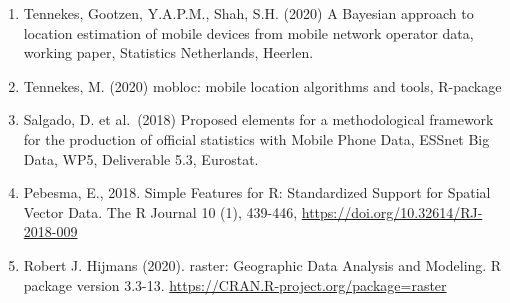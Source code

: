 \documentclass[
]{article}
\providecommand{\tightlist}{%
  \setlength{\itemsep}{0pt}\setlength{\parskip}{0pt}}
\begin{document}
\begin{enumerate}
\def\labelenumi{\arabic{enumi}.}
\tightlist
\item
  Tennekes, Gootzen, Y.A.P.M., Shah, S.H. (2020) A Bayesian approach to
  location estimation of mobile devices from mobile network operator
  data, working paper, Statistics Netherlands, Heerlen.
\item
  Tennekes, M. (2020) mobloc: mobile location algorithms and tools,
  R-package
\item
  Salgado, D. et al.~(2018) Proposed elements for a methodological
  framework for the production of official statistics with Mobile Phone
  Data, ESSnet Big Data, WP5, Deliverable 5.3, Eurostat.
\item
  Pebesma, E., 2018. Simple Features for R: Standardized Support for
  Spatial Vector Data. The R Journal 10 (1), 439-446,
  \url{https://doi.org/10.32614/RJ-2018-009}
\item
  Robert J. Hijmans (2020). raster: Geographic Data Analysis and
  Modeling. R package version 3.3-13.
  \url{https://CRAN.R-project.org/package=raster}
\end{enumerate}
\end{document}
